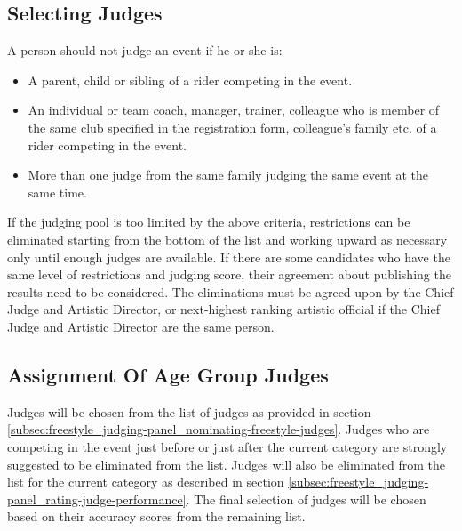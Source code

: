 \subsection{Selecting Judges \label{subsec:freestyle_judging-panel_selecting-judges}}
A person should not judge an event if he or she is:
\begin{itemize}
\item A parent, child or sibling of a rider competing in the event.
\item An individual or team coach, manager, trainer, colleague who is member of the same club specified in the registration form, colleague's family etc.
of a rider competing in the event.
\item More than one judge from the same family judging the same event at the same time.
\end{itemize}
If the judging pool is too limited by the above criteria, restrictions can be eliminated starting from the bottom of the list and working upward as necessary only until enough judges are available.
If there are some candidates who have the same level of restrictions and judging score, their agreement about publishing the results need to be considered.
The eliminations must be agreed upon by the Chief Judge and Artistic Director, or next-highest ranking artistic official if the Chief Judge and Artistic Director are the same person.

\subsection{Assignment Of Age Group Judges}
Judges will be chosen from the list of judges as provided in section \ref{subsec:freestyle_judging-panel_nominating-freestyle-judges}.
Judges who are competing in the event just before or just after the current category are strongly suggested to be eliminated from the list.
Judges will also be eliminated from the list for the current category as described in section \ref{subsec:freestyle_judging-panel_rating-judge-performance}.
The final selection of judges will be chosen based on their accuracy scores from the remaining list.

